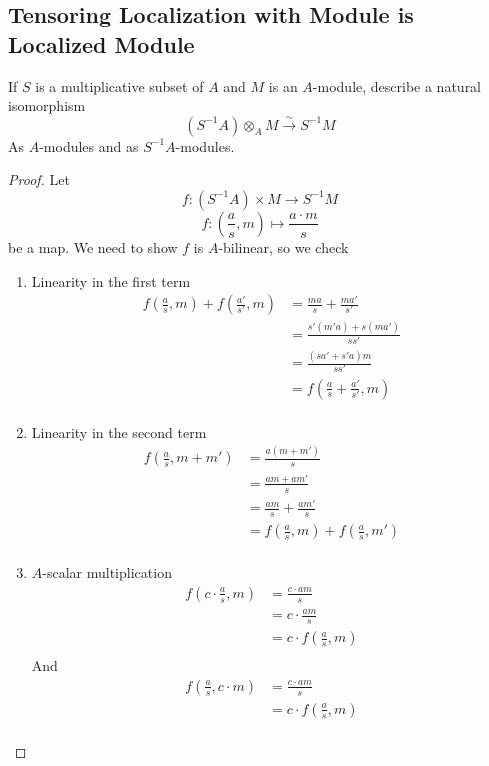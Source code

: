 \documentclass[hidelinks,12pt]{article}
\begin{document}
\subsection{Tensoring Localization with Module is Localized Module}
If \(S\) is a multiplicative subset of \(A\) and \(M\) is an \(A\)-module, describe a natural isomorphism \[
    (S^{-1}A)\otimes_{A}M\overset{\sim}{\to}S^{-1}M
\]
As \(A\)-modules and as \(S^{-1}A\)-modules.
\begin{proof}
Let \[
    f:(S^{-1}A)\times M\to S^{-1}M
\]
\[
f:\left(\frac{a}{s},m\right)\mapsto \frac{a\cdot m}{s}
\]
be a map. We need to show \(f\) is \(A\)-bilinear, so we check
\begin{enumerate}[label=(\roman*).]
    \item Linearity in the first term
       \begin{align*}
           f\left(\frac{a}{s},m\right)+f\left(\frac{a'}{s'},m\right)&=\frac{ma}{s}+\frac{ma'}{s'}\\
                                                                    &=\frac{s'(m'a)+s(ma')}{ss'}\\
       &=\frac{(sa'+s'a)m}{ss'}\\
       &=f\left(\frac{a}{s}+\frac{a'}{s'},m\right)\\
       \end{align*}
    \item Linearity in the second term
        \begin{align*}
        f\left(\frac{a}{s},m+m'\right)&=\frac{a(m+m')}{s}\\
        &=\frac{am+am'}{s}\\
        &=\frac{am}{s}+\frac{am'}{s}\\
        &=f\left(\frac{a}{s},m\right)+f\left(\frac{a}{s},m'\right)\\
        \end{align*}
    \item \(A\)-scalar multiplication
        \begin{align*}
        f\left(c\cdot \frac{a}{s},m\right)&=\frac{c\cdot am}{s}\\
        &=c\cdot\frac{am}{s}\\
        &=c\cdot f\left(\frac{a}{s},m\right)\\
        \end{align*}
        And
        \begin{align*}
        f\left(\frac{a}{s},c\cdot m\right)&=\frac{c\cdot am}{s}\\
        &=c\cdot f\left(\frac{a}{s},m\right)\\

\end{align*}
\end{enumerate}
\end{proof}
\end{document}
